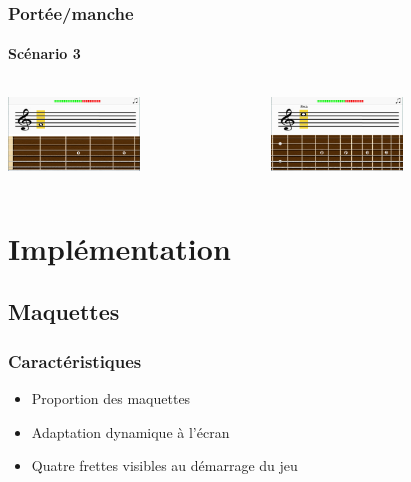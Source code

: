 \documentclass{beamer}
\begin{document}
	\begin{frame}

   		\frametitle{Portée/manche}

       		\framesubtitle{Scénario 3}

	\begin{columns}

	 	\begin{column}{0.4\textwidth}

		\includegraphics[width=3.5cm]{images/portee_question.png}

		\end{column}

	 \begin{column}{0.4\textwidth}

		\includegraphics[width=3.5cm]{images/portee_8va.png}

	\end{column}

	\end{columns} 

	\end{frame}




\section{Implémentation}

\subsection{Maquettes}

	\begin{frame}

   		\frametitle{Caractéristiques}


	\begin{itemize}
		\item  Proportion des maquettes 	
		\item  Adaptation dynamique à l'écran
		\item Quatre frettes visibles au démarrage du jeu
	\end{itemize}


	\end{frame}
\end{document}

